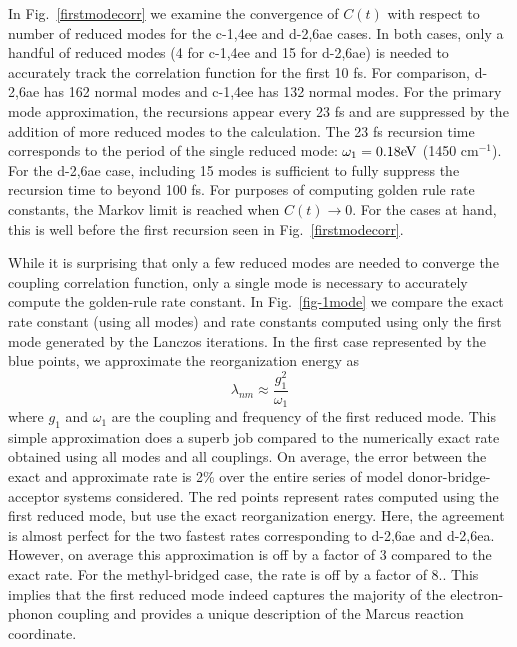 In Fig.~\ref{firstmodecorr}  we examine the convergence of $C(t)$ with respect to number of reduced modes for the c-1,4ee and d-2,6ae cases.
In both cases,  only a handful of reduced modes (4 for c-1,4ee and 15 for d-2,6ae)  is needed to  accurately track the
correlation function for the first 10 fs.   For comparison, d-2,6ae has 162 normal modes and c-1,4ee has 132 normal modes.
For the primary mode approximation, the recursions appear every 23 fs
and are suppressed by the addition of more reduced modes to the calculation.
The 23 fs recursion time corresponds to the period of the single reduced mode: $\omega_{1} = 0.18{\rm eV}$ (1450 cm$^{-1}$).
For the d-2,6ae case, including 15 modes is sufficient to fully suppress the recursion time to  beyond 100 fs.
 For purposes of computing golden rule rate constants,  the Markov limit is reached when
 $C(t)\to 0$.   For the cases at hand, this is well before the first recursion seen in Fig.~\ref{firstmodecorr}.

While it is surprising that only a few reduced modes are needed to converge the coupling correlation function, only
a single mode is necessary to accurately compute the golden-rule rate constant.
In Fig.~\ref{fig-1mode} we compare the exact rate constant (using all modes) and rate constants computed using
only the first mode generated by the Lanczos iterations.   In the first case represented by the blue points,
we approximate the reorganization energy as
$$
\lambda_{nm} \approx \frac{g_{1}^{2}}{\omega_1}
$$
where $g_{1}$ and $\omega_{1}$ are the coupling and frequency of the first  reduced mode.  This simple approximation
does a superb job compared to the numerically exact rate obtained using all modes and all couplings.
On average, the error between the exact and approximate rate is 2\%
over the entire series of model donor-bridge-acceptor systems considered.
The red points represent rates computed using the first reduced mode, but use the exact reorganization energy.
Here, the agreement is almost perfect for the two fastest rates corresponding to d-2,6ae and d-2,6ea.   However,  on average
this approximation is off by a factor of 3 compared to the exact rate.  For the methyl-bridged case, the rate is off by a factor of 8..
This implies that the first reduced mode indeed captures the majority of the electron-phonon coupling
 and provides a unique description of the Marcus reaction coordinate.

